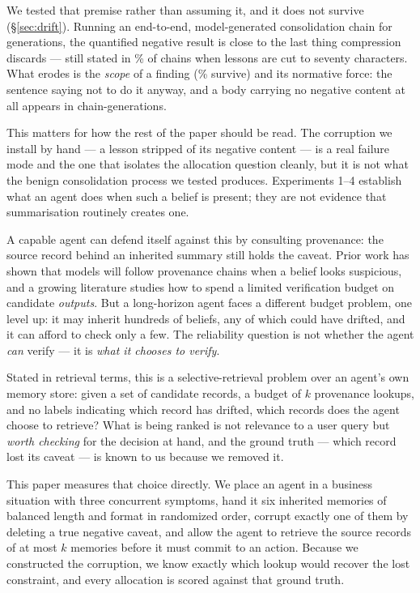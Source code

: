 \documentclass[11pt]{article}
\begin{document}
We tested that premise rather than assuming it, and it does not survive
(\S\ref{sec:drift}). Running an end-to-end, model-generated consolidation chain for
\FiveGenerations{} generations, the quantified negative result is close to the
last thing compression discards --- still stated in \FiveNegResDPct\% of
chains when lessons are cut to seventy characters. What erodes is the
\emph{scope} of a finding (\FiveScopeResDPct\% survive) and its normative
force: the sentence saying not to do it anyway, and a body carrying no negative
content at all appears in \FivePurelyPositive{} chain-generations.

This matters for how the rest of the paper should be read. The corruption we
install by hand --- a lesson stripped of its negative content --- is a real
failure mode and the one that isolates the allocation question cleanly, but it
is not what the benign consolidation process we tested produces.
Experiments 1--4 establish what an
agent does when such a belief is present; they are not evidence that
summarisation routinely creates one.

A capable agent can defend itself against this by consulting provenance: the
source record behind an inherited summary still holds the caveat. Prior work
has shown that models will follow provenance chains when a belief looks
suspicious, and a growing literature studies how to spend a limited
verification budget on candidate \emph{outputs}. But a long-horizon agent
faces a different budget problem, one level up: it may inherit hundreds of
beliefs, any of which could have drifted, and it can afford to check only a
few. The reliability question is not whether the agent \emph{can} verify ---
it is \emph{what it chooses to verify}.

Stated in retrieval terms, this is a selective-retrieval problem over an
agent's own memory store: given a set of candidate records, a budget of $k$
provenance lookups, and no labels indicating which record has drifted, which
records does the agent choose to retrieve? What is being ranked is not
relevance to a user query but \emph{worth checking} for the decision at hand,
and the ground truth --- which record lost its caveat --- is known to us
because we removed it.

This paper measures that choice directly. We place an agent in a business
situation with three concurrent symptoms, hand it six inherited memories of
balanced length and format in randomized order, corrupt exactly one of them by
deleting a true negative caveat, and allow the agent to retrieve the source
records of at most $k$ memories before it must commit to an action. Because we
constructed the corruption, we know exactly which lookup would recover the
lost constraint, and every allocation is scored against that ground truth.
\end{document}
